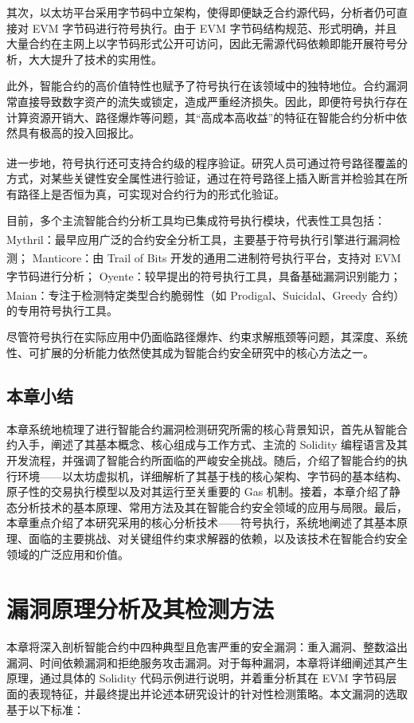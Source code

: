 \documentclass[print, master, vlined, timesmath]{DissertUESTC}
\begin{document}
其次，以太坊平台采用字节码中立架构，使得即便缺乏合约源代码，分析者仍可直接对 EVM 字节码进行符号执行。由于 EVM 字节码结构规范、形式明确，并且大量合约在主网上以字节码形式公开可访问，因此无需源代码依赖即能开展符号分析，大大提升了技术的实用性。

此外，智能合约的高价值特性也赋予了符号执行在该领域中的独特地位。合约漏洞常直接导致数字资产的流失或锁定，造成严重经济损失。因此，即便符号执行存在计算资源开销大、路径爆炸等问题，其“高成本高收益”的特征在智能合约分析中依然具有极高的投入回报比。


进一步地，符号执行还可支持合约级的程序验证\textsuperscript{\cite{...}}。研究人员可通过符号路径覆盖的方式，对某些关键性安全属性进行验证，通过在符号路径上插入断言并检验其在所有路径上是否恒为真，可实现对合约行为的形式化验证。

目前，多个主流智能合约分析工具均已集成符号执行模块，代表性工具包括：
Mythril\textsuperscript{\cite{...}}：最早应用广泛的合约安全分析工具，主要基于符号执行引擎进行漏洞检测；
Manticore\textsuperscript{\cite{...}}：由 Trail of Bits 开发的通用二进制符号执行平台，支持对 EVM 字节码进行分析；
Oyente\textsuperscript{\cite{...}}：较早提出的符号执行工具，具备基础漏洞识别能力；
Maian\textsuperscript{\cite{...}}：专注于检测特定类型合约脆弱性（如 Prodigal、Suicidal、Greedy 合约）的专用符号执行工具。

尽管符号执行在实际应用中仍面临路径爆炸、约束求解瓶颈等问题，其深度、系统性、可扩展的分析能力依然使其成为智能合约安全研究中的核心方法之一。
\section{本章小结}
本章系统地梳理了进行智能合约漏洞检测研究所需的核心背景知识，首先从智能合约入手，阐述了其基本概念、核心组成与工作方式、主流的 Solidity 编程语言及其开发流程，并强调了智能合约所面临的严峻安全挑战。随后，介绍了智能合约的执行环境——以太坊虚拟机，详细解析了其基于栈的核心架构、字节码的基本结构、原子性的交易执行模型以及对其运行至关重要的 Gas 机制。接着，本章介绍了静态分析技术的基本原理、常用方法及其在智能合约安全领域的应用与局限。最后，本章重点介绍了本研究采用的核心分析技术——符号执行，系统地阐述了其基本原理、面临的主要挑战、对关键组件约束求解器的依赖，以及该技术在智能合约安全领域的广泛应用和价值。

\chapter{漏洞原理分析及其检测方法}
本章将深入剖析智能合约中四种典型且危害严重的安全漏洞：重入漏洞、整数溢出漏洞、时间依赖漏洞和拒绝服务攻击漏洞。对于每种漏洞，本章将详细阐述其产生原理，通过具体的 Solidity 代码示例进行说明，并着重分析其在 EVM 字节码层面的表现特征，并最终提出并论述本研究设计的针对性检测策略。本文漏洞的选取基于以下标准：
\end{document}
